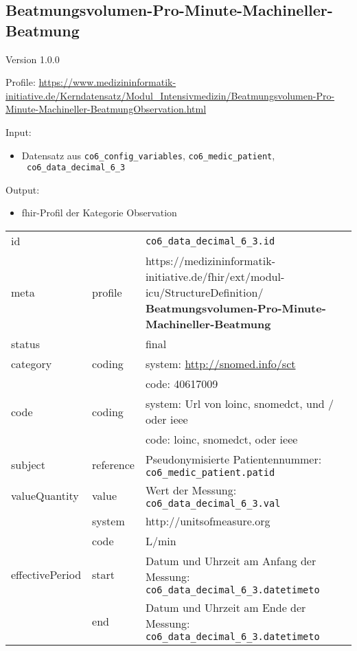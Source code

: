 \subsection{Beatmungsvolumen-Pro-Minute-Machineller-Beatmung} 
\noindent Version 1.0.0

\noindent Profile: \url{https://www.medizininformatik-initiative.de/Kerndatensatz/Modul_Intensivmedizin/Beatmungsvolumen-Pro-Minute-Machineller-BeatmungObservation.html}

\noindent Input:
\begin{itemize}
	\item Datensatz aus \texttt{co6\_config\_variables}, \texttt{co6\_medic\_patient}, \\ \texttt{
co6\_data\_decimal\_6\_3}
\end{itemize}
Output:
\begin{itemize}
        \item \ac{fhir}-Profil der Kategorie \glqq Observation\grqq{}
\end{itemize}
\begin{longtable}{|l|l|p{7.5cm}|}
        \hline
        \rowcolor{lightgray} \multicolumn{3}{|l|}{Data Mapping (inhaltlich)} \\ \hline
        id &  & \texttt{co6\_data\_decimal\_6\_3.id} \\ \hline
	meta & profile & https://medizininformatik-initiative.de/fhir/ext/modul-icu/StructureDefinition/\textbf{
Beatmungsvolumen-Pro-Minute-Machineller-Beatmung} \\ \hline 
	status &  & final  \\ \hline 
	category & coding & system: \url{http://snomed.info/sct} \\
\cline{3-3}
	& & code: 40617009 \\ \hline
	code & coding & system: Url von \ac{loinc}, \ac{snomedct}, und / oder \ac{ieee} \\ 
	\cline{3-3} 
	 &  & code: \ac{loinc}, \ac{snomedct}, oder \ac{ieee} \\ \hline
	subject & reference & Pseudonymisierte Patientennummer: \texttt{co6\_medic\_patient.patid} \\ \hline
	valueQuantity & value & Wert der Messung: \texttt{
co6\_data\_decimal\_6\_3.val} \\
        \cline{2-3}
         & system & http://unitsofmeasure.org \\
         \cline{2-3}
         & code &
L/min
\\ \hline
    effectivePeriod & start & Datum und Uhrzeit am Anfang der Messung: \texttt{
co6\_data\_decimal\_6\_3.datetimeto} \\
    \cline{2-3}
     & end & Datum und Uhrzeit am Ende der Messung: \texttt{
co6\_data\_decimal\_6\_3.datetimeto} \\ \hline
\end{longtable}


